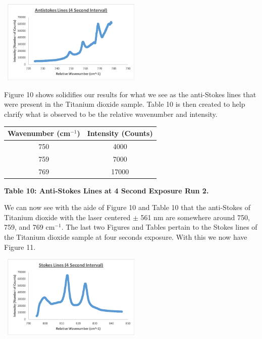 \documentclass[]{article}
\begin{document}
\begin{multicols}{2}
\begin{center}
    \includegraphics[width=7cm, height=4cm]{PHYS 331 RS (4 Sec) 2a.png}
    \caption{\textbf{\small{Figure 10:} Anti-Stokes Lines at 4 Second Exposure Run 2.}}
\end{center}
Figure 10 shows solidifies our results for what we see as the anti-Stokes lines that were present in the Titanium dioxide sample. Table 10 is then created to help clarify what is observed to be the relative wavenumber and intensity.
\newline
\begin{tabular}{|c|c|}
    \hline \textbf{Wavenumber (cm$^{-1}$)} & \textbf{Intensity (Counts)} \\ \hline
    750 & 4000 \\ \hline
    759 & 7000 \\ \hline
    769 & 17000 \\ \hline
\end{tabular}
\centerline{\tiny\textbf{{Table 10: Anti-Stokes Lines at 4 Second Exposure Run 2.}}}
\newline
We can now see with the aide of Figure 10 and Table 10 that the anti-Stokes of Titanium dioxide with the laser centered $\pm$ 561 nm are somewhere around 750, 759, and 769 cm$^{-1}$. The last two Figures and Tables pertain to the Stokes lines of the Titanium dioxide sample at four seconds exposure. With this we now have Figure 11.
\begin{center}
    \includegraphics[width=7cm, height=4cm]{PHYS 331 RS (4 Sec) 1b.png}
    \caption{\textbf{\small{Figure 11:} Stokes Lines at 4 Second Exposure Run 1.}}

\end{center}
\end{multicols}
\end{document}
